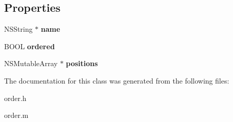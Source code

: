 \subsection*{Properties}
\begin{DoxyCompactItemize}
\item 
\hypertarget{interfaceorder_a540009a931ea3dd3cd57c18c79ef859f}{}N\+S\+String $\ast$ {\bfseries name}\label{interfaceorder_a540009a931ea3dd3cd57c18c79ef859f}

\item 
\hypertarget{interfaceorder_aa03018f2db3152c4f73268ba8ece47a9}{}B\+O\+O\+L {\bfseries ordered}\label{interfaceorder_aa03018f2db3152c4f73268ba8ece47a9}

\item 
\hypertarget{interfaceorder_a91f8148afb653ea299d569edbc060ce8}{}N\+S\+Mutable\+Array $\ast$ {\bfseries positions}\label{interfaceorder_a91f8148afb653ea299d569edbc060ce8}

\end{DoxyCompactItemize}


The documentation for this class was generated from the following files\+:\begin{DoxyCompactItemize}
\item 
order.\+h\item 
order.\+m\end{DoxyCompactItemize}

